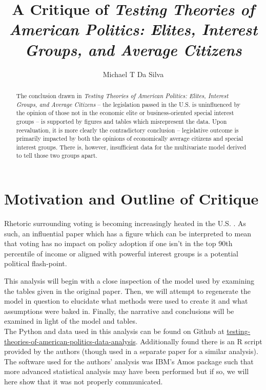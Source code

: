 \documentclass[]{article}
\title{A Critique of \textit{Testing Theories of American Politics: Elites, Interest Groups, and Average Citizens} \cite{gilens}}
\author{Michael T Da Silva}
\begin{document}
\maketitle

\begin{abstract}
	The conclusion drawn in \textit{Testing Theories of American Politics: Elites, Interest Groups, and Average Citizens} -- the legislation passed in the U.S. is uninfluenced by the opinion of those not in the economic elite or business-oriented special interest groups -- is supported by figures and tables which misrepresent the data. Upon reevaluation, it is more clearly the contradictory conclusion -- legislative outcome is primarily impacted by both the opinions of economically average citizens and special interest groups. There is, however, insufficient data for the multivariate model derived to tell those two groups apart.

\end{abstract}

\section{Motivation and Outline of Critique}
Rhetoric surrounding voting is becoming increasingly heated in the U.S. \cite{voting_rights}. 
As such, an influential paper which has a figure which can be interpreted to mean that voting has no impact on policy adoption if one isn't in the top 90th percentile of income or aligned with powerful interest groups is a potential political flash-point.

This analysis will begin with a close inspection of the model used by examining the tables given in the original paper.
Then, we will attempt to regenerate the model in question to elucidate what methods were used to create it and what assumptions were baked in.
Finally, the narrative and conclusions will be examined in light of the model and tables.\\

The Python and data used in this analysis can be found on Github at \href{https://github.com/ChemistryMickey/testing-theories-of-american-politics-data-analysis}{testing-theories-of-american-politics-data-analysis}. Additionally found there is an R script provided by the authors (though used in a separate paper for a similar analysis). The software used for the authors' analysis was IBM's Amos package such that more advanced statistical analysis may have been performed but if so, we will here show that it was not properly communicated.
\end{document}
